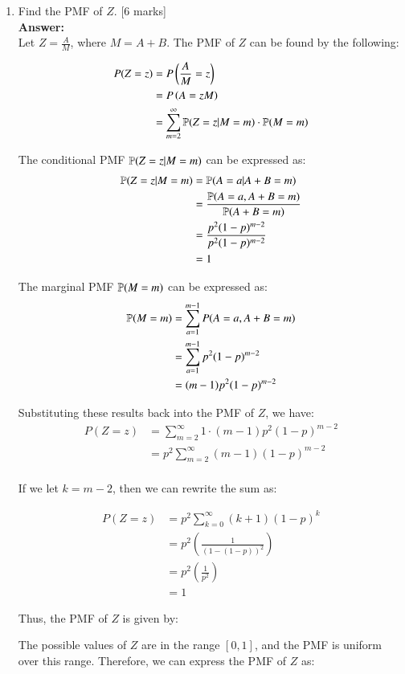 \documentclass[12pt]{article}
\begin{document}
\begin{enumerate}
\begin{enumerate}
\item Find the PMF of $Z$.  
			\hfill [6 marks]
%
\\
\textbf{Answer:}
\\
Let $Z = \frac{A}{M}$, where $M = A + B$. The PMF of $Z$ can be found by the following:

\begin{align*}
  P(Z=z) &= P\left(\frac{A}{M} = z\right) \\
  &= P\left(A = zM\right) \\
  &= \sum_{m=2}^{\infty} {\mathbb P}(Z=z | M=m) \cdot {\mathbb P}(M=m) \\
\end{align*}

The conditional PMF ${\mathbb P}(Z=z | M=m)$ can be expressed as:
\begin{align*}
  {\mathbb P}(Z=z | M=m) &= {\mathbb P}(A = a | A + B = m) \\
  &= \frac{{\mathbb P}(A = a, A + B = m)}{{\mathbb P}(A + B = m)} \\
  &= \frac{p^2(1-p)^{m-2}}{p^2(1-p)^{m-2}} \\
  &= 1
\end{align*}

The marginal PMF ${\mathbb P}(M=m)$ can be expressed as:
\begin{align*}
  {\mathbb P}(M=m) &= \sum_{a=1}^{m-1} P(A=a, A + B = m) \\
  &= \sum_{a=1}^{m-1} p^2(1-p)^{m-2} \\
  &= (m-1)p^2(1-p)^{m-2}
\end{align*}

Substituting these results back into the PMF of $Z$, we have:
\begin{align*}
  P(Z=z) &= \sum_{m=2}^{\infty} 1 \cdot (m-1)p^2(1-p)^{m-2} \\
  &= p^2 \sum_{m=2}^{\infty} (m-1)(1-p)^{m-2} \\
\end{align*}

If we let $k = m-2$, then we can rewrite the sum as:

\begin{align*}
  P(Z=z) &= p^2 \sum_{k=0}^{\infty} (k+1)(1-p)^{k} \\
  &= p^2 \left(\frac{1}{(1-(1-p))^2}\right) \\
  &= p^2 \left(\frac{1}{p^2}\right) \\
  &= 1
\end{align*}

Thus, the PMF of $Z$ is given by:

The possible values of $Z$ are in the range $[0, 1]$, and the PMF is uniform over this range. Therefore, we can express the PMF of $Z$ as:


\end{enumerate}
\end{enumerate}
\end{document}
